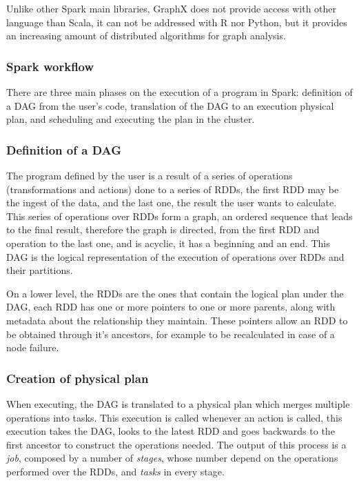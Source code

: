 \documentclass[11pt]{article} %
\begin{document}
          Unlike other Spark main libraries, GraphX does not provide access with other language than Scala, it can not be addressed with R nor Python, but it provides an increasing amount of distributed algorithms for graph analysis.

      \subsubsection{Spark workflow}

        There are three main phases on the execution of a program in Spark: definition of a DAG from the user's code, translation of the DAG to an execution physical plan, and scheduling and executing the plan in the cluster.

        \subsubsection*{Definition of a DAG}

          The program defined by the user is a result of a series of operations (transformations and actions) done to a series of RDDs, the first RDD may be the ingest of the data, and the last one, the result the user wants to calculate. This series of operations over RDDs form a graph, an ordered sequence that leads to the final result, therefore the graph is directed, from the first RDD and operation to the last one, and is acyclic, it has a beginning and an end. This DAG is the logical representation of the execution of operations over RDDs and their partitions.

          On a lower level, the RDDs are the ones that contain the logical plan under the DAG, each RDD has one or more pointers to one or more parents, along with metadata about the relationship they maintain. These pointers allow an RDD to be obtained through it's ancestors, for example to be recalculated in case of a node failure.

        \subsubsection*{Creation of physical plan}

          When executing, the DAG is translated to a physical plan which merges multiple operations into tasks. This execution is called whenever an action is called, this execution takes the DAG, looks to the latest RDD and goes backwards to the first ancestor to construct the operations needed. The output of this process is a \emph{job}, composed by a number of \emph{stages}, whose number depend on the operations performed over the RDDs, and \emph{tasks} in every stage.
\end{document}

